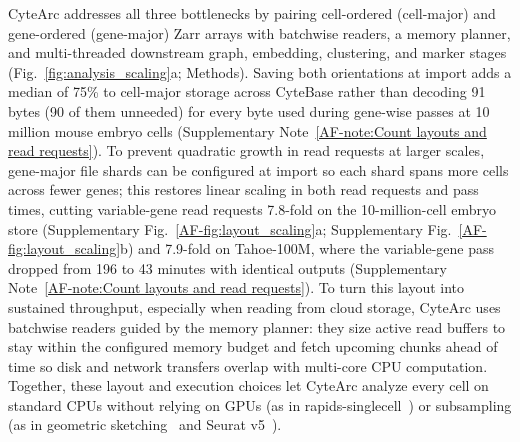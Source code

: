 \documentclass[11pt]{article}
\newcommand{\sref}[1]{\ref*{AF-#1}}
\begin{document}
CyteArc addresses all three bottlenecks by pairing cell-ordered (cell-major) and gene-ordered (gene-major) Zarr arrays with batchwise readers, a memory planner, and multi-threaded downstream graph, embedding, clustering, and marker stages (Fig.~\ref{fig:analysis_scaling}a; Methods). Saving both orientations at import adds a median of 75\% to cell-major storage across CyteBase rather than decoding 91 bytes (90 of them unneeded) for every byte used during gene-wise passes at 10 million mouse embryo cells (Supplementary Note~\sref{note:Count layouts and read requests}). To prevent quadratic growth in read requests at larger scales, gene-major file shards can be configured at import so each shard spans more cells across fewer genes; this restores linear scaling in both read requests and pass times, cutting variable-gene read requests 7.8-fold on the 10-million-cell embryo store (Supplementary Fig.~\sref{fig:layout_scaling}a; Supplementary Fig.~\sref{fig:layout_scaling}b) and 7.9-fold on Tahoe-100M, where the variable-gene pass dropped from 196 to 43 minutes with identical outputs (Supplementary Note~\sref{note:Count layouts and read requests}). To turn this layout into sustained throughput, especially when reading from cloud storage, CyteArc uses batchwise readers guided by the memory planner: they size active read buffers to stay within the configured memory budget and fetch upcoming chunks ahead of time so disk and network transfers overlap with multi-core CPU computation. Together, these layout and execution choices let CyteArc analyze every cell on standard CPUs without relying on GPUs (as in rapids-singlecell~\cite{dicks2026rapids}) or subsampling (as in geometric sketching~\cite{hie2019geometric} and Seurat v5~\cite{hao2024seurat}).
\end{document}
